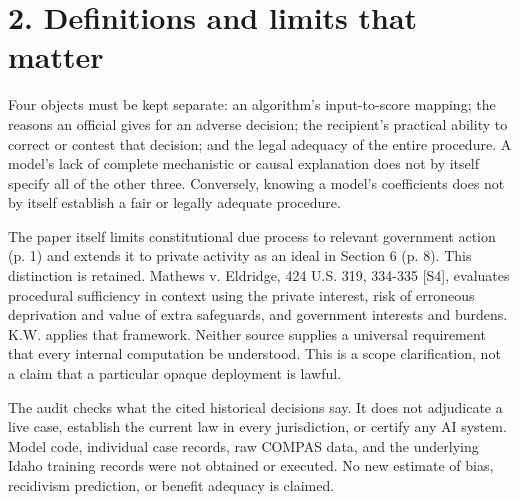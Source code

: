 \documentclass[10pt]{article}
\begin{document}
\section*{2. Definitions and limits that matter}
Four objects must be kept separate: an algorithm’s input-to-score mapping; the reasons an official gives for an adverse decision; the recipient’s practical ability to correct or contest that decision; and the legal adequacy of the entire procedure. A model’s lack of complete mechanistic or causal explanation does not by itself specify all of the other three. Conversely, knowing a model’s coefficients does not by itself establish a fair or legally adequate procedure.\par
The paper itself limits constitutional due process to relevant government action (p. 1) and extends it to private activity as an ideal in Section 6 (p. 8). This distinction is retained. Mathews v. Eldridge, 424 U.S. 319, 334-335 [S4], evaluates procedural sufficiency in context using the private interest, risk of erroneous deprivation and value of extra safeguards, and government interests and burdens. K.W. applies that framework. Neither source supplies a universal requirement that every internal computation be understood. This is a scope clarification, not a claim that a particular opaque deployment is lawful.\par
The audit checks what the cited historical decisions say. It does not adjudicate a live case, establish the current law in every jurisdiction, or certify any AI system. Model code, individual case records, raw COMPAS data, and the underlying Idaho training records were not obtained or executed. No new estimate of bias, recidivism prediction, or benefit adequacy is claimed.\par
\end{document}
